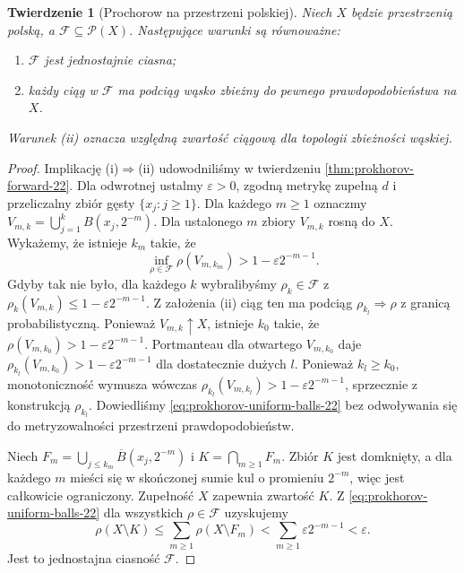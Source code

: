\documentclass[11pt,a4paper,oneside]{book}
\numberwithin{equation}{chapter}
\theoremstyle{plain}
\newtheorem{twierdzenie}{Twierdzenie}[chapter]
\theoremstyle{definition}
\theoremstyle{remark}
\begin{document}
\begin{twierdzenie}[Prochorow na przestrzeni polskiej]
\label{thm:prokhorov-22}
Niech $X$ będzie przestrzenią polską, a
$\mathcal F\subseteq\mathcal P(X)$.
Następujące warunki są równoważne:
\begin{enumerate}[label=(\roman*)]
\item $\mathcal F$ jest jednostajnie ciasna;
\item każdy ciąg w $\mathcal F$ ma podciąg wąsko
zbieżny do pewnego prawdopodobieństwa na $X$.
\end{enumerate}
Warunek (ii) oznacza względną zwartość
ciągową dla topologii zbieżności wąskiej.
\end{twierdzenie}
\begin{proof}
Implikację (i)$\Rightarrow$(ii) udowodniliśmy w twierdzeniu
\ref{thm:prokhorov-forward-22}. Dla odwrotnej
ustalmy $\varepsilon>0$, zgodną metrykę zupełną $d$
i przeliczalny zbiór gęsty $\{x_j:j\ge1\}$.
Dla każdego $m\ge1$ oznaczmy
$V_{m,k}=\bigcup_{j=1}^k B(x_j,2^{-m})$.
Dla ustalonego $m$ zbiory $V_{m,k}$ rosną do $X$.
Wykażemy, że istnieje $k_m$ takie, że
\begin{equation}\label{eq:prokhorov-uniform-balls-22}
\inf_{\rho\in\mathcal F}\rho(V_{m,k_m})
>1-\varepsilon2^{-m-1}.
\end{equation}
Gdyby tak nie było, dla każdego $k$ wybralibyśmy
$\rho_k\in\mathcal F$ z
$\rho_k(V_{m,k})\le1-\varepsilon2^{-m-1}$.
Z założenia (ii) ciąg ten ma podciąg
$\rho_{k_l}\Rightarrow\rho$ z granicą probabilistyczną.
Ponieważ $V_{m,k}\uparrow X$, istnieje $k_0$ takie,
że $\rho(V_{m,k_0})>1-\varepsilon2^{-m-1}$.
Portmanteau dla otwartego $V_{m,k_0}$ daje
$\rho_{k_l}(V_{m,k_0})>1-\varepsilon2^{-m-1}$
dla dostatecznie dużych $l$. Ponieważ $k_l\ge k_0$,
monotoniczność wymusza wówczas
$\rho_{k_l}(V_{m,k_l})>1-\varepsilon2^{-m-1}$,
sprzecznie z konstrukcją $\rho_{k_l}$.
Dowiedliśmy \eqref{eq:prokhorov-uniform-balls-22}
bez odwoływania się do metryzowalności
przestrzeni prawdopodobieństw.

Niech $F_m=\bigcup_{j\le k_m}\overline B(x_j,2^{-m})$
i $K=\bigcap_{m\ge1}F_m$. Zbiór $K$ jest domknięty,
a dla każdego $m$ mieści się w skończonej sumie kul
o promieniu $2^{-m}$, więc jest całkowicie ograniczony.
Zupełność $X$ zapewnia zwartość $K$.
Z \eqref{eq:prokhorov-uniform-balls-22} dla wszystkich
$\rho\in\mathcal F$ uzyskujemy
\[
 \rho(X\setminus K)\le\sum_{m\ge1}\rho(X\setminus F_m)
 <\sum_{m\ge1}\varepsilon2^{-m-1}<\varepsilon.
\]
Jest to jednostajna ciasność $\mathcal F$.
\end{proof}
\end{document}
